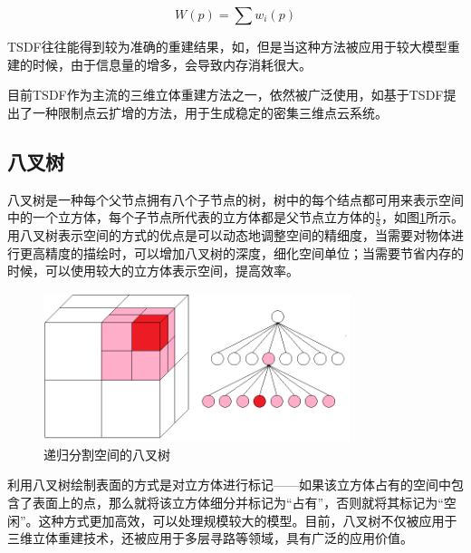 \documentclass{llncs}
\begin{document}
\begin{CJK}{UTF8}{song}
\begin{equation}
\label{W_cal}
	W(p) = \sum w_i(p)
\end{equation}

TSDF往往能得到较为准确的重建结果，如\cite{DBLP:conf/cvpr/FioraioTFSI15,DBLP:conf/icra/ForsterPS14}，但是当这种方法被应用于较大模型重建的时候，由于信息量的增多，会导致内存消耗很大。

目前TSDF作为主流的三维立体重建方法之一，依然被广泛使用，如\cite{DBLP:journals/corr/abs-1710-07242}基于TSDF提出了一种限制点云扩增的方法，用于生成稳定的密集三维点云系统。





	\subsection{八叉树}
八叉树是一种每个父节点拥有八个子节点的树\cite{Wurm2010OctoMap}，树中的每个结点都可用来表示空间中的一个立方体，每个子节点所代表的立方体都是父节点立方体的$\frac{1}{8}$，如图\ref{Octree}所示。用八叉树表示空间的方式的优点是可以动态地调整空间的精细度，当需要对物体进行更高精度的描绘时，可以增加八叉树的深度，细化空间单位；当需要节省内存的时候，可以使用较大的立方体表示空间，提高效率。

\begin{figure}
\centering
\includegraphics[width=0.8\textwidth]{picts/octree.png}
\caption{递归分割空间的八叉树}
\label{Octree}
\end{figure}

利用八叉树绘制表面的方式是对立方体进行标记——如果该立方体占有的空间中包含了表面上的点，那么就将该立方体细分并标记为“占有”，否则就将其标记为“空闲”。这种方式更加高效，可以处理规模较大的模型。目前，八叉树不仅被应用于三维立体重建技术\cite{DBLP:conf/icra/SenguptaS15}，还被应用于多层寻路\cite{DBLP:journals/cgf/JiaZYP18}等领域，具有广泛的应用价值。



\end{CJK}
\end{document}
